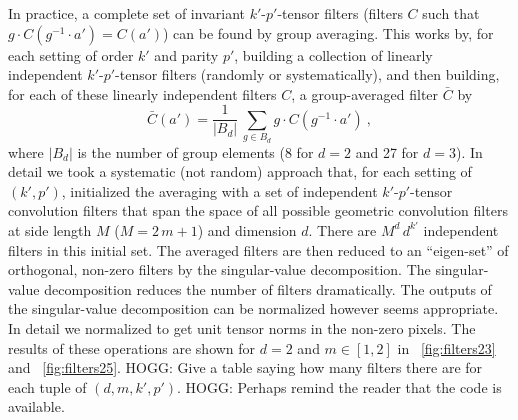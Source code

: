 \documentclass{article}
\theoremstyle{plain}
\newcommand{\figref}[1]{\figurename~\ref{#1}}
\begin{document}
In practice, a complete set of invariant $k'$-$p'$-tensor filters (filters $C$ such that $g\cdot C(g^{-1} \cdot a') = C(a')$) can be found by group averaging.
This works by, for each setting of order $k'$ and parity $p'$, building a collection of linearly independent $k'$-$p'$-tensor filters (randomly or systematically), and then building, for each of these linearly independent filters $C$, a group-averaged filter $\bar{C}$ by
\begin{equation}
    \bar{C}(a') = \frac{1}{|B_d|}\,\sum_{g\in B_d} g\cdot C(g^{-1}\cdot a') ~,
\end{equation}
where $|B_d|$ is the number of group elements (8 for $d=2$ and 27 for $d=3$).
In detail we took a systematic (not random) approach that, for each setting of $(k',p')$, initialized the averaging with a set of independent $k'$-$p'$-tensor convolution filters that span the space of all possible geometric convolution filters at side length $M$ ($M=2\,m+1$) and dimension $d$.
There are $M^d\,d^{k'}$ independent filters in this initial set.
The averaged filters are then reduced to an ``eigen-set'' of orthogonal, non-zero filters by the singular-value decomposition.
The singular-value decomposition reduces the number of filters dramatically.
The outputs of the singular-value decomposition can be normalized however seems appropriate.
In detail we normalized to get unit tensor norms in the non-zero pixels.
The results of these operations are shown for $d=2$ and $m\in[1, 2]$ in \figref{fig:filters23} and \figref{fig:filters25}.
HOGG: Give a table saying how many filters there are for each tuple of $(d,m,k',p')$.
HOGG: Perhaps remind the reader that the code is available.
\end{document}
